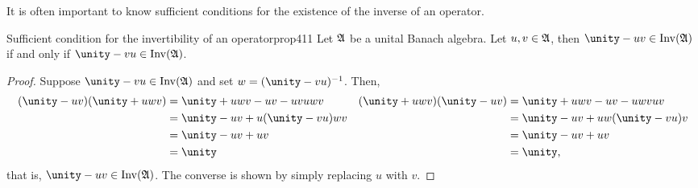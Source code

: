 It is often important to know sufficient conditions for the existence of the inverse of an operator.
\begin{proposition}{Sufficient condition for the invertibility of an operator}{prop411}
    Let \(\mathfrak{A}\) be a unital Banach algebra. Let \(u, v \in \mathfrak{A}\), then \(\unity - uv \in \invertible{\algebra{A}}\) if and only if \(\unity - vu \in \invertible{\algebra{A}}\).
\end{proposition}
\begin{proof}
    Suppose \(\unity - vu \in \invertible{\algebra{A}}\) and set \(w = (\unity - vu)^{-1}\). Then,
    \begin{align*}
        (\unity - uv)(\unity + uwv) &= \unity + uwv - uv - uvuwv&
        (\unity + uwv)(\unity - uv) &= \unity + uwv - uv - uwvuv\\
                                    &= \unity - uv + u(\unity - vu)wv&
                                    &= \unity - uv + uw(\unity - vu)v\\
                                    &= \unity - uv + uv&
                                    &= \unity - uv + uv\\
                                    &= \unity&
                                    &= \unity,
    \end{align*}
    that is, \(\unity - uv \in \invertible{\algebra{A}}\). The converse is shown by simply replacing \(u\) with \(v\).
\end{proof}

